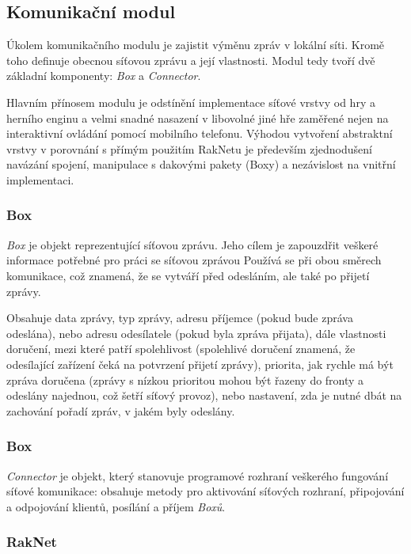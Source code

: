 \documentclass[thesis=B,czech,hidelinks]{FITthesis}[2012/06/26] %
\begin{document}
\subsection{Komunikační modul}

Úkolem komunikačního modulu je zajistit výměnu zpráv v lokální síti. Kromě toho definuje obecnou síťovou zprávu a její vlastnosti. Modul tedy tvoří dvě základní komponenty: \textit{Box} a \textit{Connector}. 

Hlavním přínosem modulu je odstínění implementace síťové vrstvy od hry a herního enginu a velmi snadné nasazení v libovolné jiné hře zaměřené nejen na interaktivní ovládání pomocí mobilního telefonu. Výhodou vytvoření abstraktní vrstvy v porovnání s přímým použitím RakNetu je především zjednodušení navázání spojení, manipulace s dakovými pakety (Boxy) a nezávislost na vnitřní implementaci.


\subsubsection{Box}

\textit{Box} je objekt reprezentující síťovou zprávu. Jeho cílem je zapouzdřit veškeré informace potřebné pro práci se síťovou zprávou Používá se při obou směrech komunikace, což znamená, že se vytváří před odesláním, ale také po přijetí zprávy.

Obsahuje data zprávy, typ zprávy, adresu příjemce (pokud bude zpráva odeslána), nebo adresu odesílatele (pokud byla zpráva přijata), dále vlastnosti doručení, mezi které patří spolehlivost (spolehlivé doručení znamená, že odesílající zařízení čeká na potvrzení přijetí zprávy), priorita, jak rychle má být zpráva doručena (zprávy s nízkou prioritou mohou být řazeny do fronty a odeslány najednou, což šetří síťový provoz), nebo nastavení, zda je nutné dbát na zachování pořadí zpráv, v jakém byly odeslány.

\subsubsection{Box}

\textit{Connector} je objekt, který stanovuje programové rozhraní veškerého fungování síťové komunikace: obsahuje metody pro aktivování síťových rozhraní, připojování a odpojování klientů, posílání a příjem \textit{Boxů}. 

\subsubsection{RakNet}
\end{document}
